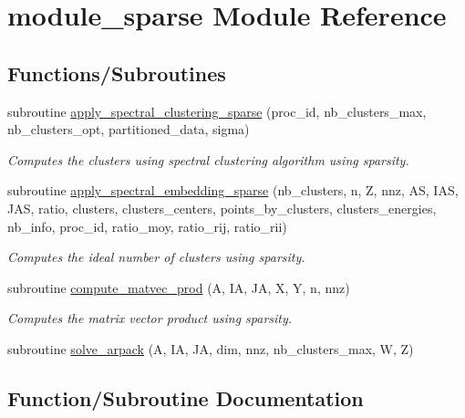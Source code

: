\hypertarget{namespacemodule__sparse}{}\section{module\+\_\+sparse Module Reference}
\label{namespacemodule__sparse}
\subsection*{Functions/\+Subroutines}
\begin{DoxyCompactItemize}
\item 
subroutine \hyperlink{namespacemodule__sparse_ac7a222921bd378c5d9d8d41fa05423ad}{apply\+\_\+spectral\+\_\+clustering\+\_\+sparse} (proc\+\_\+id, nb\+\_\+clusters\+\_\+max, nb\+\_\+clusters\+\_\+opt, partitioned\+\_\+data, sigma)
\begin{DoxyCompactList}\small\item\em Computes the clusters using spectral clustering algorithm using sparsity. \end{DoxyCompactList}\item 
subroutine \hyperlink{namespacemodule__sparse_a6fc2f45f94f4ea124ea27f88b8823274}{apply\+\_\+spectral\+\_\+embedding\+\_\+sparse} (nb\+\_\+clusters, n, Z, nnz, A\+S, I\+A\+S, J\+A\+S, ratio, clusters, clusters\+\_\+centers, points\+\_\+by\+\_\+clusters, clusters\+\_\+energies, nb\+\_\+info, proc\+\_\+id, ratio\+\_\+moy, ratio\+\_\+rij, ratio\+\_\+rii)
\begin{DoxyCompactList}\small\item\em Computes the ideal number of clusters using sparsity. \end{DoxyCompactList}\item 
subroutine \hyperlink{namespacemodule__sparse_a172821d54ec6f3bec6f07ca4f9d96d37}{compute\+\_\+matvec\+\_\+prod} (A, I\+A, J\+A, X, Y, n, nnz)
\begin{DoxyCompactList}\small\item\em Computes the matrix vector product using sparsity. \end{DoxyCompactList}\item 
subroutine \hyperlink{namespacemodule__sparse_a1945ecdb844a637fd6372b3686b4df40}{solve\+\_\+arpack} (A, I\+A, J\+A, dim, nnz, nb\+\_\+clusters\+\_\+max, W, Z)
\end{DoxyCompactItemize}


\subsection{Function/\+Subroutine Documentation}
\hypertarget{namespacemodule__sparse_ac7a222921bd378c5d9d8d41fa05423ad}{}
